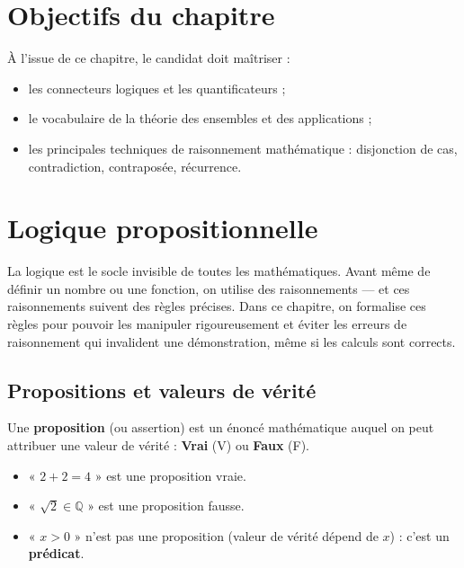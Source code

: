 \documentclass[11pt,a4paper,twoside]{book}
\newcommand{\Q}{\mathbb{Q}}
\begin{document}
\section*{Objectifs du chapitre}

À l'issue de ce chapitre, le candidat doit maîtriser :
\begin{itemize}
  \item les connecteurs logiques et les quantificateurs ;
  \item le vocabulaire de la théorie des ensembles et des applications ;
  \item les principales techniques de raisonnement mathématique :
        disjonction de cas, contradiction, contraposée, récurrence.
\end{itemize}

\section{Logique propositionnelle}

La logique est le socle invisible de toutes les mathématiques. Avant même de définir un nombre ou une fonction, on utilise des raisonnements — et ces raisonnements suivent des règles précises. Dans ce chapitre, on formalise ces règles pour pouvoir les manipuler rigoureusement et éviter les erreurs de raisonnement qui invalident une démonstration, même si les calculs sont corrects.

\subsection{Propositions et valeurs de vérité}

\begin{definitionbox}[Proposition]
Une \textbf{proposition} (ou assertion) est un énoncé mathématique auquel on peut attribuer
une valeur de vérité : \textbf{Vrai} (V) ou \textbf{Faux} (F).
\end{definitionbox}

\begin{exemplebox}
\begin{itemize}
  \item « $2 + 2 = 4$ » est une proposition vraie.
  \item « $\sqrt{2} \in \Q$ » est une proposition fausse.
  \item « $x > 0$ » n'est pas une proposition (valeur de vérité dépend de $x$) : c'est un
        \textbf{prédicat}.
\end{itemize}
\end{exemplebox}
\end{document}

